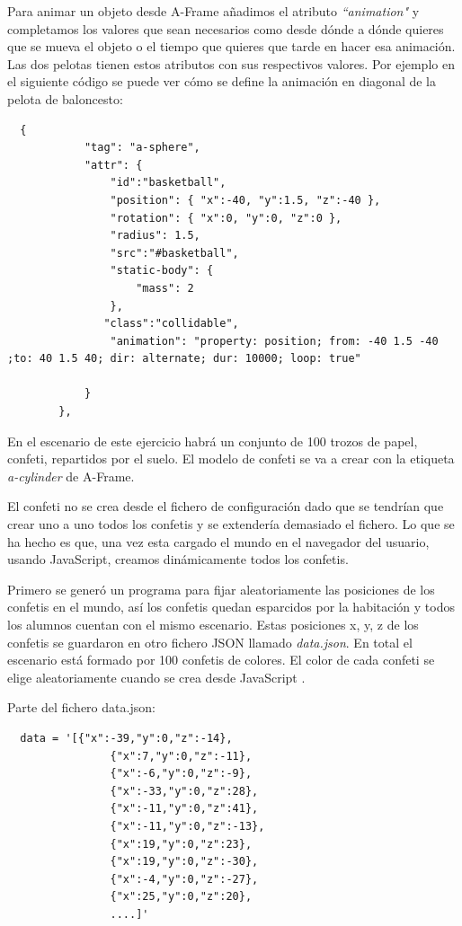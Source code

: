 Para animar un objeto desde A-Frame añadimos el atributo \textit{``animation"} y completamos los valores que sean necesarios como desde dónde a dónde quieres que se mueva  el objeto o el tiempo que quieres que tarde en hacer esa animación. Las dos pelotas tienen estos atributos con sus respectivos valores. Por ejemplo en el siguiente código se puede ver cómo se define la animación en diagonal de la pelota de baloncesto: 
\begin{lstlisting}
  {
            "tag": "a-sphere",
            "attr": {
                "id":"basketball",
                "position": { "x":-40, "y":1.5, "z":-40 },
                "rotation": { "x":0, "y":0, "z":0 },
                "radius": 1.5,
                "src":"#basketball",
                "static-body": {
                    "mass": 2
                },              
	           "class":"collidable",
                "animation": "property: position; from: -40 1.5 -40 ;to: 40 1.5 40; dir: alternate; dur: 10000; loop: true"

            }
        },

\end{lstlisting}

En el escenario de este ejercicio habrá un conjunto de 100 trozos de papel, confeti, repartidos por el suelo. El modelo de confeti se va a crear con la etiqueta \textit{a-cylinder} de A-Frame. 

El confeti no se crea desde el fichero de configuración dado que se tendrían que crear uno a uno  todos los confetis y se extendería demasiado el fichero. Lo que se ha hecho es que, una vez esta cargado el mundo en el navegador del usuario, usando JavaScript, creamos dinámicamente todos los confetis.

Primero se generó un programa para fijar aleatoriamente las posiciones de los confetis en el mundo, así los confetis quedan esparcidos por la habitación y todos los alumnos cuentan con el mismo escenario. Estas posiciones x, y, z de los confetis se guardaron en otro fichero JSON llamado \textit{data.json}. En total el escenario está formado por 100 confetis de colores. El color de cada confeti se elige aleatoriamente cuando se crea desde JavaScript .

Parte del fichero data.json: 
\begin{lstlisting}
  data = '[{"x":-39,"y":0,"z":-14},
                {"x":7,"y":0,"z":-11},
                {"x":-6,"y":0,"z":-9},
                {"x":-33,"y":0,"z":28},
                {"x":-11,"y":0,"z":41},
                {"x":-11,"y":0,"z":-13},
                {"x":19,"y":0,"z":23},
                {"x":19,"y":0,"z":-30},
                {"x":-4,"y":0,"z":-27},
                {"x":25,"y":0,"z":20},
                ....]'
 \end{lstlisting}



